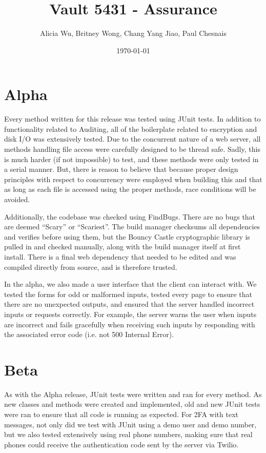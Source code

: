\documentclass{article}
\title{Vault 5431 - Assurance}
\author{Alicia Wu, Britney Wong, Chang Yang Jiao, Paul Chesnais}
\date{\today}
\begin{document}
\maketitle
\thispagestyle{empty}
\section{Alpha}
\par Every method written for this release was tested using JUnit tests. In addition to functionality related to Auditing, all of the boilerplate related to encryption and disk I/O was extensively tested. Due to the concurrent nature of a web server, all methods handling file access were carefully designed to be thread safe. Sadly, this is much harder (if not impossible) to test, and these methods were only tested in a serial manner. But, there is reason to believe that because proper design principles with respect to concurrency were employed when building this and that as long as each file is accessed using the proper methods, race conditions will be avoided.

\par Additionally, the codebase was checked using FindBugs. There are no bugs that are deemed ``Scary'' or ``Scariest''. The build manager checksums all dependencies and verifies before using them, but the Bouncy Castle cryptographic library is pulled in and checked manually, along with the build manager itself at first install. There is a final web dependency that needed to be edited and was compiled directly from source, and is therefore trusted.

\par In the alpha, we also made a user interface that the client can interact with. We tested the forms for odd or malformed inputs, tested every page to ensure that there are no unexpected outputs, and ensured that the server handled incorrect inputs or requests correctly. For example, the server warns the user when inputs are incorrect and fails gracefully when receiving such inputs by responding with the associated error code (i.e. not 500 Internal Error).

\section{Beta}
\par As with the Alpha release, JUnit tests were written and ran for every method. As new classes and methods were created and implemented, old and new JUnit tests were ran to ensure that all code is running as expected. For 2FA with text messages, not only did we test with JUnit using a demo user and demo number, but we also tested extensively using real phone numbers, making sure that real phones could receive the authentication code sent by the server via Twilio.
\end{document}
